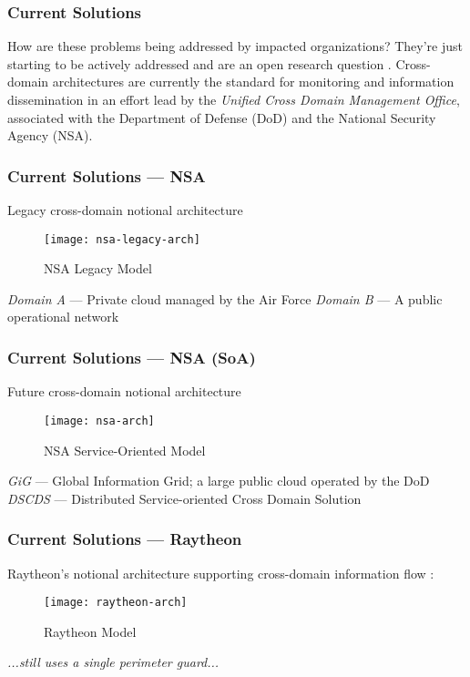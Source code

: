 \begin{frame}[t]
\frametitle{Current Solutions}
How are these problems being addressed by impacted organizations?
\newline
\newline
\pause
They're just starting to be actively addressed and are an open research question \cite{proposal:assured-info-sharing}.
\newline
\newline
Cross-domain architectures are currently the standard for monitoring and information dissemination in an effort lead by the \textit{Unified Cross Domain Management Office}, associated with the Department of Defense (DoD) and the National Security Agency (NSA).
\end{frame}

\begin{frame}[t]
\frametitle{Current Solutions --- NSA}
Legacy cross-domain notional architecture \cite{proposal:nsa-arch}
\begin{figure}[!t]
\centering
\texttt{[image: nsa-legacy-arch]}
\caption{NSA Legacy Model}
\label{fig:model:conceptual-model-nsa-legacy}
\end{figure}

\textit{Domain A} --- Private cloud managed by the Air Force
\newline
\textit{Domain B} --- A public operational network
\end{frame}

\begin{frame}[t]
\frametitle{Current Solutions --- NSA (SoA)}
Future cross-domain notional architecture \cite{proposal:nsa-arch}
\begin{figure}[!t]
\centering
\texttt{[image: nsa-arch]}
\caption{NSA Service-Oriented Model}
\label{fig:model:conceptual-model-nsa}
\end{figure}

\textit{GiG} --- Global Information Grid; a large public cloud operated by the DoD
\newline
\textit{DSCDS} --- Distributed Service-oriented Cross Domain Solution
\end{frame}

\begin{frame}[t]
\frametitle{Current Solutions --- Raytheon}
Raytheon's notional architecture supporting cross-domain information flow \cite{proposal:raytheon-arch}:
\begin{figure}[!t]
\centering
\texttt{[image: raytheon-arch]}
\caption{Raytheon Model}
\label{fig:model:conceptual-model-raytheon}
\end{figure}

\textit{...still uses a single perimeter guard...}
\end{frame}

